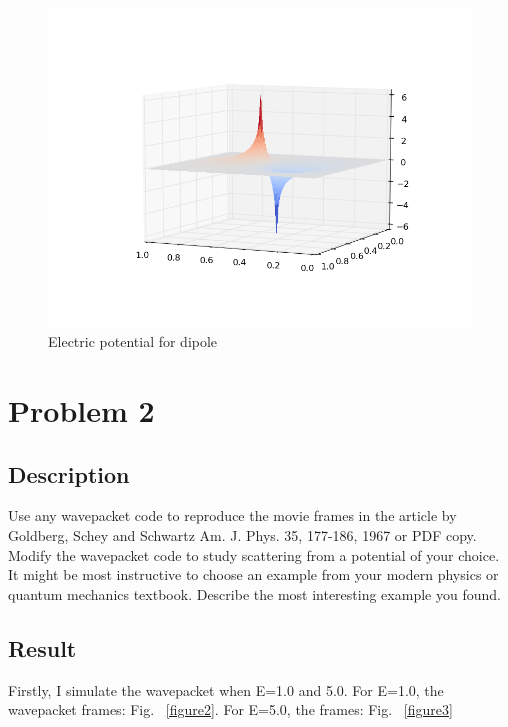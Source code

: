 \documentclass[11pt,letterpaper]{article}
\begin{document}
\begin{figure}
\begin{center}
\includegraphics[width=0.8\linewidth,angle=0]{dipole1.png}
\caption{Electric potential for dipole}
\label{figure1}
\end{center}
\end{figure}









\newpage

\section{Problem 2}

\subsection{Description}
Use any wavepacket code to reproduce the movie frames in the article by Goldberg, Schey and Schwartz Am. J. Phys. 35, 177-186, 1967 or PDF copy. 
Modify the wavepacket code to study scattering from a potential of your choice. It might be most instructive to choose an example from your modern physics or quantum mechanics textbook. Describe the most interesting example you found.

\subsection{Result}

Firstly, I simulate the wavepacket when E=1.0 and 5.0. For E=1.0, the wavepacket frames: Fig. ~\ref{figure2}. For E=5.0, the frames: Fig. ~\ref{figure3}
\end{document}
